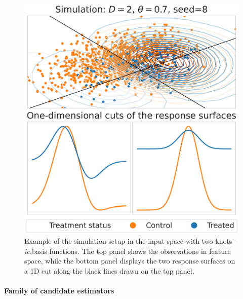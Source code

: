 \documentclass[french,12pt,twoside,a4paper]{book}
\begin{document}
\begin{figure}[b!]
  \begin{minipage}{0.3\textwidth}
    \caption{Example of the simulation setup in the input space with two
      knots --\emph{ie.}basis functions. The top panel
      shows the observations in feature space, while the bottom panel displays the
      two response surfaces on a 1D cut along the black lines drawn on
      the top panel.}
    \label{fig:simulation_examples}
  \end{minipage}
  \hfill
  \begin{minipage}{0.65\textwidth}
    \centering
    \includegraphics[width=0.8\linewidth]{img/chapter_5/caussim_example_rs_gaussian=8_rs_rotation=8_ntv=0.37_D=2_overlap=0.7_p_A=0.1.pdf}
  \end{minipage}
\end{figure}


\paragraph{Family of candidate estimators}
\end{document}
